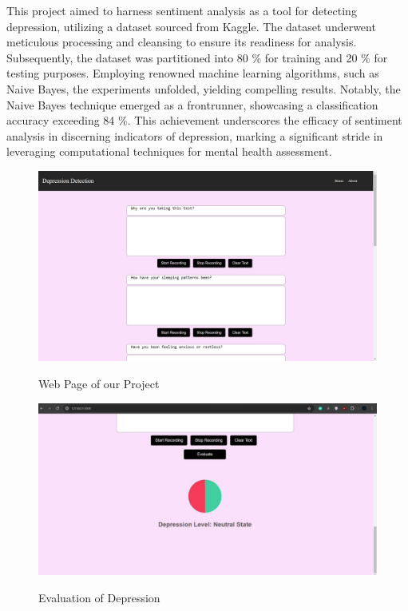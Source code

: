 This project aimed to harness sentiment analysis as a tool for detecting depression, utilizing a dataset sourced from Kaggle. The dataset underwent meticulous processing and cleansing to ensure its readiness for analysis. Subsequently, the dataset was partitioned into 80 \% for training and 20 \% for testing purposes. Employing renowned machine learning algorithms, such as Naive Bayes, the experiments unfolded, yielding compelling results. Notably, the Naive Bayes technique emerged as a frontrunner, showcasing a classification accuracy exceeding 84 \%. This achievement underscores the efficacy of sentiment analysis in discerning indicators of depression, marking a significant stride in leveraging computational techniques for mental health assessment.
\\
 \begin{figure}[htbp]
    \centering
     \includegraphics[width=1.0\linewidth]{C_chap/fig39.jpg}
\\\caption{Web Page of our Project}
 \end{figure}
 \begin{figure}[htbp]
    \centering
     \includegraphics[width=1.0\linewidth]{C_chap/fig40.png}
\\\caption{Evaluation of Depression}
 \end{figure}
